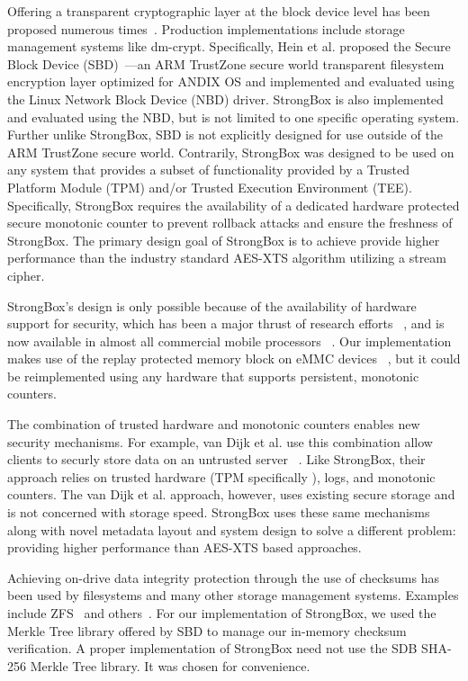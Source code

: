 Offering a transparent cryptographic layer at the block device level has been
proposed numerous times~\cite{SBD}. Production implementations include storage
management systems like dm-crypt. Specifically, Hein et al. proposed the Secure
Block Device (SBD)~\cite{SBD}---an ARM TrustZone secure world transparent
filesystem encryption layer optimized for ANDIX OS and implemented and evaluated
using the Linux Network Block Device (NBD) driver. StrongBox is also implemented
and evaluated using the NBD, but is not limited to one specific operating
system. Further unlike StrongBox, SBD is not explicitly designed for use outside
of the ARM TrustZone secure world. Contrarily, StrongBox was designed to be used
on any system that provides a subset of functionality provided by a Trusted
Platform Module (TPM) and/or Trusted Execution Environment (TEE). Specifically,
StrongBox requires the availability of a dedicated hardware protected secure
monotonic counter to prevent rollback attacks and ensure the freshness of
StrongBox. The primary design goal of StrongBox is to achieve provide higher
performance than the industry standard AES-XTS algorithm utilizing a stream
cipher.

StrongBox's design is only possible because of the availability of
hardware support for security, which has been a major thrust of
research efforts
~\cite{asplos1,asplos2,asplos3,asplos4,isca1,isca2},
and is now available in almost all commercial mobile processors
~\cite{TPM,TEE,RPMB,Kirovski}. Our implementation makes use of the
replay protected memory block on eMMC devices
~\cite{eMMC-standard,RPMB}, but it could be reimplemented using any
hardware that supports persistent, monotonic counters.

The combination of trusted hardware and monotonic counters enables new
security mechanisms. For example, van Dijk et al. use this
combination allow clients to securly store data on an untrusted server
~\cite{CSAIL-TPM}. Like StrongBox, their approach relies on trusted
hardware (TPM specifically \cite{TPM}), logs, and monotonic counters.
The van Dijk et al. approach, however, uses existing secure storage
and is not concerned with storage speed. StrongBox uses these same
mechanisms along with novel metadata layout and system design to solve
a different problem: providing higher performance than AES-XTS based
approaches.

Achieving on-drive data integrity protection through the use of checksums has
been used by filesystems and many other storage management systems. Examples
include ZFS~\cite{ZFS} and others~\cite{SBD}. For our implementation of
StrongBox, we used the Merkle Tree library offered by SBD to manage our
in-memory checksum verification. A proper implementation of StrongBox need not
use the SDB SHA-256 Merkle Tree library. It was chosen for convenience.
